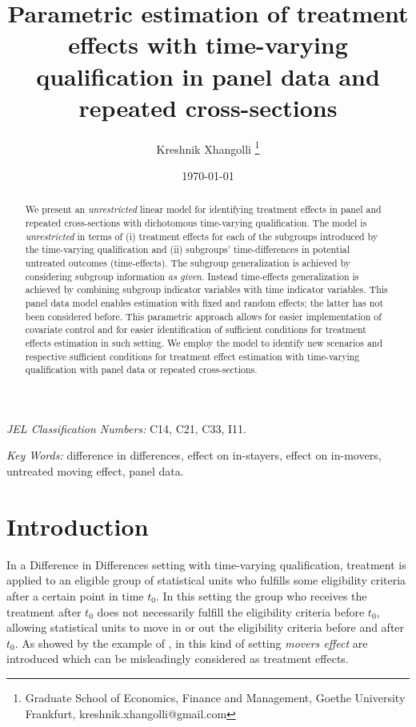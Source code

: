\documentclass[12pt]{article}
\title{Parametric estimation of treatment effects with time-varying qualification in panel data and repeated cross-sections}
\date{\today}
\author{Kreshnik Xhangolli \footnote{Graduate School of Economics, Finance and Management, Goethe University Frankfurt, kreshnik.xhangolli@gmail.com}}
\begin{document}
	\maketitle
	
	\begin{abstract}
		We present an \textit{unrestricted} linear model for identifying treatment effects in panel and repeated cross-sections with dichotomous time-varying qualification. The model is \textit{unrestricted} in terms of (i) treatment effects for each of the subgroups introduced by the time-varying qualification and (ii) subgroups' time-differences in potential untreated outcomes (time-effects). The subgroup generalization is achieved by considering subgroup information \textit{as given}. Instead time-effects generalization is achieved by combining subgroup indicator variables with time indicator variables. This panel data model enables estimation with fixed and random effects; the latter has not been considered before. This parametric approach allows for easier implementation of covariate control and for easier identification of sufficient conditions for treatment effects estimation in such setting. We employ the model to identify new scenarios and respective sufficient conditions for treatment effect estimation with time-varying qualification with panel data or repeated cross-sections.
	\end{abstract}

\textit{JEL Classification Numbers:} C14, C21, C33, I11.

\textit{Key Words:} difference in differences, effect on in-stayers, effect on in-movers, untreated moving effect, panel data.
\pagebreak

\section{Introduction}

In a Difference in Differences setting with time-varying qualification, treatment is applied to an eligible group of statistical units who fulfills some eligibility criteria after a certain point in time $t_0$. In this setting the group who receives the treatment after $t_0$ does not necessarily fulfill the eligibility criteria before $t_0$, allowing statistical units to move in or out the eligibility criteria before and after $t_0$. As showed by the example of \cite{lee2014difference}, in this kind of setting \textit{movers effect} are introduced which can be misleadingly considered as treatment effects.
\end{document}

